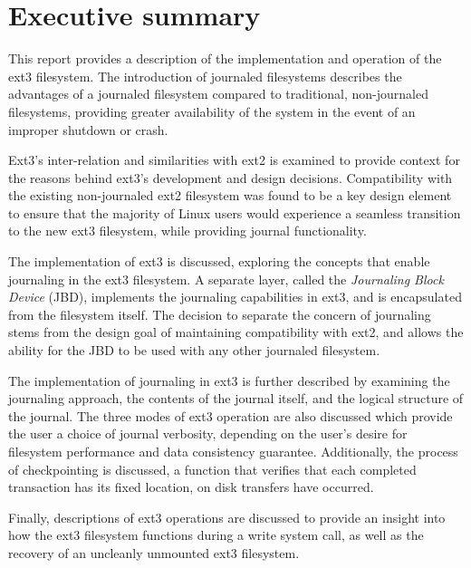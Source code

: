 \section{Executive summary}

This report provides a description of the implementation and operation of the ext3 filesystem. The introduction of journaled filesystems describes the advantages of a journaled filesystem compared to traditional, non-journaled filesystems, providing greater availability of the system in the event of an improper shutdown or crash.

Ext3's inter-relation and similarities with ext2 is examined to provide context for the reasons behind ext3's development and design decisions. Compatibility with the existing non-journaled ext2 filesystem was found to be a key design element to ensure that the majority of Linux users would experience a seamless transition to the new ext3 filesystem, while providing journal functionality.

The implementation of ext3 is discussed, exploring the concepts that enable journaling in the ext3 filesystem. A separate layer, called the \emph{Journaling Block Device} (JBD), implements the journaling capabilities in ext3, and is encapsulated from the filesystem itself. The decision to separate the concern of journaling stems from the design goal of maintaining compatibility with ext2, and allows the ability for the JBD to be used with any other journaled filesystem.

The implementation of journaling in ext3 is further described by examining the journaling approach, the contents of the journal itself, and the logical structure of the journal. The three modes of ext3 operation are also discussed which provide the user a choice of journal verbosity, depending on the user's desire for filesystem performance and data consistency guarantee. Additionally, the process of checkpointing is discussed, a function that verifies that each completed transaction has its fixed location, on disk transfers have occurred.

Finally, descriptions of ext3 operations are discussed to provide an insight into how the ext3 filesystem functions during a write system call, as well as the recovery of an uncleanly unmounted ext3 filesystem.